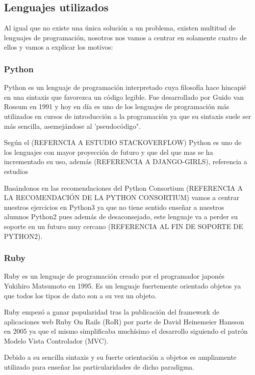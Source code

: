 \subsection{Lenguajes utilizados}

Al igual que no existe una única solución a un problema, existen multitud de lenguajes de programación, nosotros nos vamos a centrar en solamente cuatro de ellos y vamos a explicar los motivos:

\subsubsection{Python}

Python es un lenguaje de programación interpretado cuya filosofía hace hincapié en una sintaxis que favorezca un código legible. Fue desarrollado por Guido van Rossum en 1991 y hoy en día es uno de los lenguajes de programación más utilizados en cursos de introducción a la programación ya que su sintaxis suele ser más sencilla, asemejándose al 'pseudocódigo".

Según el (REFERNCIA A ESTUDIO STACKOVERFLOW) Python es uno de los lenguajes con mayor proyección de futuro y que del que mas se ha incrementado su uso, además (REFERENCIA A DJANGO-GIRLS), referencia a estudios

Basándonos en las recomendaciones del Python Consortium (REFERENCIA A LA RECOMENDACIÓN DE LA PYTHON CONSORTIUM) vamos a centrar nuestros ejercicios en Python3 ya que no tiene sentido enseñar a nuestros alumnos Python2 pues además de desaconsejado, este lenguaje va a perder su soporte en un futuro muy cercano (REFERENCIA AL FIN DE SOPORTE DE PYTHON2).

\subsubsection{Ruby}

Ruby es un lenguaje de programación creado por el programador japonés Yukihiro Matsumoto en 1995. Es un lenguaje fuertemente orientado objetos ya que todos los tipos de dato son a su vez un objeto.

\bigskip
Ruby empezó a ganar popularidad tras la publicación del framework de aplicaciones web Ruby On Rails (RoR) por parte de David Heinemeier Hansson en 2005 ya que el mismo simplificaba muchísimo el desarrollo siguiendo el patrón Modelo Vista Controlador (MVC).

\bigskip
Debido a su sencilla sintaxis y su fuerte orientación a objetos es ampliamente utilizado para enseñar las particularidades de dicho paradigma.

